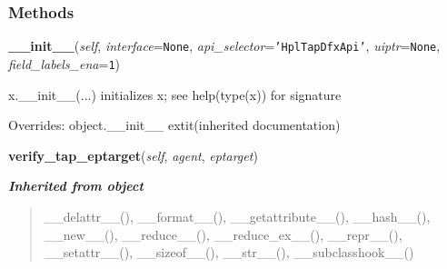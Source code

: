 
  \subsubsection{Methods}

    \vspace{0.5ex}

\hspace{.8\funcindent}\begin{boxedminipage}{\funcwidth}

    \raggedright \textbf{\_\_init\_\_}(\textit{self}, \textit{interface}={\tt None}, \textit{api\_selector}={\tt \texttt{'}\texttt{HplTapDfxApi}\texttt{'}}, \textit{uiptr}={\tt None}, \textit{field\_labels\_ena}={\tt 1})

\setlength{\parskip}{2ex}
    x.\_\_init\_\_(...) initializes x; see help(type(x)) for signature

\setlength{\parskip}{1ex}
      Overrides: object.\_\_init\_\_ 	extit{(inherited documentation)}

    \end{boxedminipage}

    \label{hpl_tap_engine:hpl_TapEngine_taplink:verify_tap_eptarget}

    \vspace{0.5ex}

\hspace{.8\funcindent}\begin{boxedminipage}{\funcwidth}

    \raggedright \textbf{verify\_tap\_eptarget}(\textit{self}, \textit{agent}, \textit{eptarget})

\setlength{\parskip}{2ex}
\setlength{\parskip}{1ex}
    \end{boxedminipage}


\large{\textbf{\textit{Inherited from object}}}

\begin{quote}
\_\_delattr\_\_(), \_\_format\_\_(), \_\_getattribute\_\_(), \_\_hash\_\_(), \_\_new\_\_(), \_\_reduce\_\_(), \_\_reduce\_ex\_\_(), \_\_repr\_\_(), \_\_setattr\_\_(), \_\_sizeof\_\_(), \_\_str\_\_(), \_\_subclasshook\_\_()
\end{quote}

